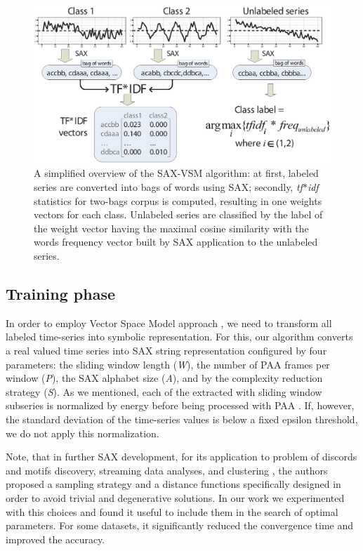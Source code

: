\documentclass{llncs}
\begin{document}
\begin{figure}[t]
   \centering
   \includegraphics[width=115mm]{figures/overview.eps}
   \caption{A simplified overview of the SAX-VSM algorithm: at first, labeled series are converted into
bags of words using SAX; 
secondly, \textit{tf$\ast$idf} statistics for two-bags corpus is computed, resulting in one weights
vectors for each class.
Unlabeled series are classified by the label of the weight vector having the maximal cosine similarity with the words frequency vector built by SAX application to the unlabeled series.}
   \label{fig:overview}
\end{figure}

\subsection{Training phase}
In order to employ Vector Space Model approach , we need to transform all labeled time-series into 
symbolic representation.  For this, our algorithm converts a real valued time series into SAX 
string representation configured by four parameters: the sliding window
length (\textit{W}), the number of PAA frames per window (\textit{P}), the SAX alphabet size
(\textit{A}), and by the complexity reduction strategy (\textit{S}). 
As we mentioned, each of the extracted with sliding window subseries is normalized by energy before
being processed with PAA \cite{goldin_kanellakis}. If, however, the standard deviation of the
time-series values is below a fixed epsilon threshold, we do not apply this normalization.



Note, that in further SAX development, for its application to problem of discords
and motifs discovery, streaming data analyses, and clustering \cite{hot_sax} \cite{streaming_sax}, 
the authors proposed a sampling strategy and a distance functions specifically designed 
in order to avoid trivial and degenerative solutions.  In our work we experimented with this choices  and 
found it useful to include them in the search of optimal parameters. For some datasets, it significantly reduced
the convergence time and improved the accuracy.
\end{document}
